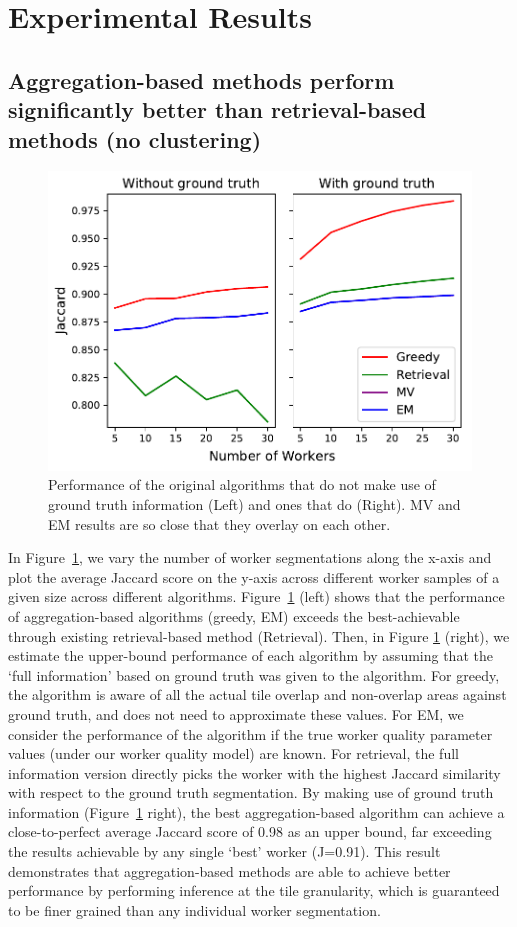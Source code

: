 \section{Experimental Results\label{sec:experiment}}
\subsection{Aggregation-based methods perform significantly better than retrieval-based methods (no clustering)}
\begin{figure}[h!]
   \centering
   \includegraphics[trim={0 1pt 4pt 0},clip,width=0.8\linewidth]{plots/Retrieval_vs_Aggregation.pdf}
   \caption{Performance of the original algorithms that do not make use of ground truth information (Left) and ones that do (Right). MV and EM results are so close that they overlay on each other.} 
   \label{retrieval_vs_aggregation}   
\end{figure} 
\npar In Figure~\ref{retrieval_vs_aggregation}, we vary the number of worker segmentations along the x-axis and plot the average Jaccard score on the y-axis across different worker samples of a given size across different algorithms. Figure~\ref{retrieval_vs_aggregation} (left) shows that the performance of aggregation-based algorithms (greedy, EM) exceeds the best-achievable through existing retrieval-based method (Retrieval). Then, in Figure \ref{retrieval_vs_aggregation} (right), we estimate the upper-bound performance of each algorithm by assuming that the `full information' based on ground truth was given to the algorithm. For greedy, the algorithm is aware of all the actual tile overlap and non-overlap areas against ground truth, and does not need to approximate these values. For EM, we consider the performance of the algorithm if the true worker quality parameter values (under our worker quality model) are known. For retrieval, the full information version directly picks the worker with the highest Jaccard similarity with respect to the ground truth segmentation. By making use of ground truth information (Figure~\ref{retrieval_vs_aggregation} right), the best aggregation-based algorithm can achieve a close-to-perfect average Jaccard score of 0.98 as an upper bound, far exceeding the results achievable by any single `best' worker (J=0.91). This result demonstrates that aggregation-based methods are able to achieve better performance by performing inference at the tile granularity, which is guaranteed to be finer grained than any individual worker segmentation. 

